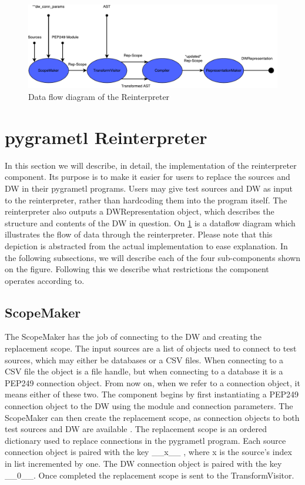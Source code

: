 \begin{figure}
\centering
\includegraphics[width=1\textwidth]{figures/reinterpreter.pdf}
\caption{Data flow diagram of the Reinterpreter}
\label{fig:reinterpreter}
\end{figure}

\section{pygrametl Reinterpreter}

In this section we will describe, in detail, the implementation of the reinterpreter component. Its purpose is to make it easier for users to replace the sources and DW in their pygrametl programs. Users may give test sources and DW as input to the reinterpreter, rather than hardcoding them into the program itself. The reinterpreter also outputs a DWRepresentation object, which describes the structure and contents of the DW in question. On \cref{fig:reinterpreter} is a dataflow diagram which illustrates the flow of data through the reinterpreter. Please note that this depiction is abstracted from the actual implementation to ease explanation. In the following subsections, we will describe each of the four sub-components shown on the figure. Following this we describe what restrictions the component operates according to.

\subsection{ScopeMaker}
The ScopeMaker has the job of connecting to the DW and creating the replacement scope. The input sources are a list of objects used to connect to test sources, which may either be databases or a CSV files. When connecting to a CSV file the object is a file handle, but when connecting to a database it is a PEP249 connection object. From now on, when we refer to a connection object, it means either of these two. The component begins by first instantiating a PEP249 connection object to the DW using the module and connection parameters. The ScopeMaker can then create the replacement scope, as connection objects to both test sources and DW are available . The replacement scope is an ordered dictionary used to replace connections in the pygrametl program. Each source connection object is paired with the key \_\_x\_\_ , where x is the source's index in list incremented by one. The DW connection object is paired with the key \_\_0\_\_. Once completed the replacement scope is sent to the TransformVisitor.

